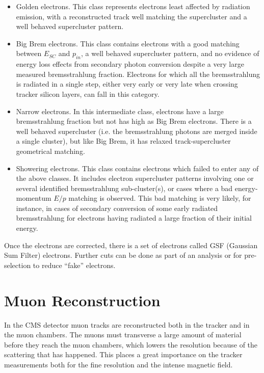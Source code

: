 \begin{itemize}
\item
  Golden electrons. This class represents electrons least affected by radiation emission, with a reconstructed track well matching the supercluster and a well behaved supercluster pattern. 
\item
  Big Brem electrons. This class contains electrons with a good matching between $E_{SC}$ and $p_{in}$, a well behaved supercluster pattern, and no evidence of energy loss effects from secondary photon conversion despite a very large measured bremsstrahlung fraction. Electrons for which all the bremsstrahlung is radiated in a single step, either very early or very late when crossing tracker silicon layers, can fall in this category.
\item
  Narrow electrons. In this intermediate class, electrons have a large bremsstrahlung fraction but not has high as Big Brem electrons.  There is a well behaved supercluster (i.e. the bremsstrahlung photons are merged inside a single cluster), but like Big Brem, it has relaxed track-supercluster geometrical matching.
\item
  Showering electrons. This class contains electrons which failed to enter any of the above classes. It includes electron supercluster patterns involving one or several identified bremsstrahlung sub-cluster(s), or cases where a bad energy-momentum $E/p$ matching is observed. This bad matching is very likely, for instance, in cases of secondary conversion of some early radiated bremsstrahlung for electrons having radiated a large fraction of their initial energy.
\end{itemize}

Once the electrons are corrected, there is a set of electrons called GSF (Gaussian Sum Filter) electrons.  Further cuts can be done as part of an analysis or for pre-selection to reduce ``fake'' electrons.

\section{Muon Reconstruction}

In the CMS detector muon tracks are reconstructed both in the tracker and in the muon chambers.  The muons must transverse a large amount of material before they reach the muon chambers, which lowers the resolution because of the scattering that has happened. This places a great importance on the tracker measurements both for the fine resolution and the intense magnetic field. 

